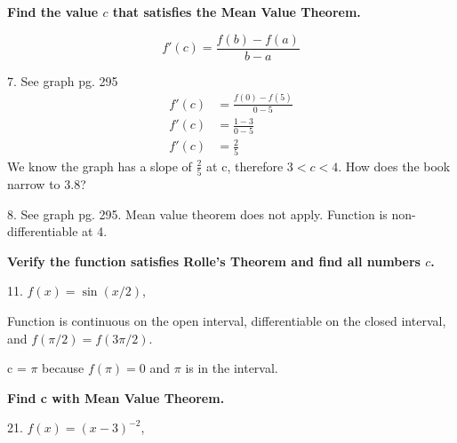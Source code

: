 \documentclass{article}
\begin{document}
\begin{description} %
      \setlength\itemsep{5em}

      \item\textbf{Find the value $c$ that satisfies the Mean Value Theorem.}

             \[f'(c) = \frac{f(b) - f(a)}{b - a}\]
            \begin{description} %
                  \setlength\itemsep{3em}

                  \item 7. See graph pg. 295
                        \begin{align*}
                              f'(c) & = \frac{f(0) - f(5)}{0 - 5} \\
                              f'(c) & = \frac{1 - 3}{0 - 5}       \\
                              f'(c) & = \frac{2}{5}
                        \end{align*}
                        We know the graph has a slope of $\frac{2}{5}$ at c, therefore $3<c<4$. How does the book narrow to 3.8?
                  \item 8. See graph pg. 295. Mean value theorem does not apply. Function is non-differentiable at 4.
            \end{description}

      \item\textbf{Verify the function satisfies Rolle's Theorem and find all numbers $c$.}
            \begin{description}
                  \item 11. $f(x) = \sin{(x/2)}$, \space [$\pi/2$, \space $3\pi/2$]

                        Function is continuous on the open interval, differentiable on the closed interval, and $f(\pi/2)=f(3\pi/2)$.

                        c = $\pi$ because $f(\pi) = 0$ and $\pi$ is in the interval.
            \end{description}
      \item\textbf{Find c with Mean Value Theorem.} %
            \begin{description}
                  \item   21. $f(x) = (x-3)^{-2}$, \space [1, \space 4]
            \end{description}


\end{description}
\end{document}
